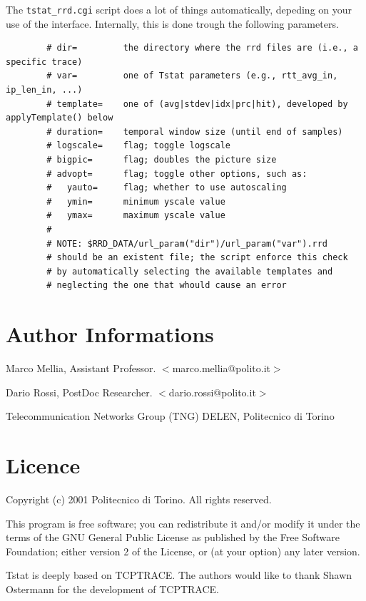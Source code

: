 \documentclass[11pt]{article}
\newcommand{\printindex}[0]{} %
\begin{document}
The \texttt{tstat\_rrd.cgi} script does a lot of things automatically,
depeding on your use of the interface. Internally, this is
done trough the following parameters.

\begin{small}\begin{verbatim}
        # dir=         the directory where the rrd files are (i.e., a specific trace)
        # var=         one of Tstat parameters (e.g., rtt_avg_in, ip_len_in, ...)
        # template=    one of (avg|stdev|idx|prc|hit), developed by applyTemplate() below
        # duration=    temporal window size (until end of samples)
        # logscale=    flag; toggle logscale
        # bigpic=      flag; doubles the picture size
        # advopt=      flag; toggle other options, such as:
        #   yauto=     flag; whether to use autoscaling
        #   ymin=      minimum yscale value
        #   ymax=      maximum yscale value
        #
        # NOTE: $RRD_DATA/url_param("dir")/url_param("var").rrd
        # should be an existent file; the script enforce this check
        # by automatically selecting the available templates and
        # neglecting the one that whould cause an error
\end{verbatim}\end{small} \noindent
\section{Author Informations\label{Author_Informations}}


Marco Mellia, Assistant Professor.
$<$marco.mellia@polito.it$>$



Dario Rossi, PostDoc Researcher.
$<$dario.rossi@polito.it$>$



Telecommunication Networks Group (TNG)
DELEN, Politecnico di Torino

\section{Licence\label{Licence}}


Copyright (c) 2001 Politecnico di Torino.  All rights reserved.



This program is free software; you can redistribute it and/or modify
it under the terms of the GNU General Public License as published by
the Free Software Foundation; either version 2 of the License, or
(at your option) any later version.



Tstat is deeply based on TCPTRACE. The authors would like to thank
Shawn Ostermann for the development of TCPTRACE.

\printindex
\end{document}

